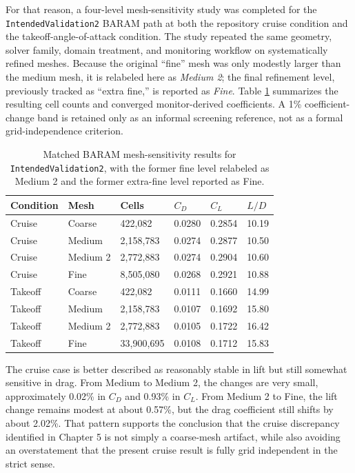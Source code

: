 \documentclass[12pt]{report}
\begin{document}
For that reason, a four-level mesh-sensitivity study was completed for the \texttt{IntendedValidation2} BARAM path at both the repository cruise condition and the takeoff-angle-of-attack condition. The study repeated the same geometry, solver family, domain treatment, and monitoring workflow on systematically refined meshes. Because the original ``fine'' mesh was only modestly larger than the medium mesh, it is relabeled here as \emph{Medium 2}; the final refinement level, previously tracked as ``extra fine,'' is reported as \emph{Fine}. Table \ref{tab:intendedvalidation2-grid-independence} summarizes the resulting cell counts and converged monitor-derived coefficients. A 1\% coefficient-change band is retained only as an informal screening reference, not as a formal grid-independence criterion.

\begin{table}[htbp]
\centering
\caption{Matched BARAM mesh-sensitivity results for \texttt{IntendedValidation2}, with the former fine level relabeled as Medium 2 and the former extra-fine level reported as Fine.}
\label{tab:intendedvalidation2-grid-independence}
\begin{tabular}{llllll}
\toprule
\textbf{Condition} & \textbf{Mesh} & \textbf{Cells} & \textbf{$C_D$} & \textbf{$C_L$} & \textbf{$L/D$} \\
\midrule
Cruise & Coarse & 422,082 & 0.0280 & 0.2854 & 10.19 \\
Cruise & Medium & 2,158,783 & 0.0274 & 0.2877 & 10.50 \\
Cruise & Medium 2 & 2,772,883 & 0.0274 & 0.2904 & 10.60 \\
Cruise & Fine & 8,505,080 & 0.0268 & 0.2921 & 10.88 \\
Takeoff & Coarse & 422,082 & 0.0111 & 0.1660 & 14.99 \\
Takeoff & Medium & 2,158,783 & 0.0107 & 0.1692 & 15.80 \\
Takeoff & Medium 2 & 2,772,883 & 0.0105 & 0.1722 & 16.42 \\
Takeoff & Fine & 33,900,695 & 0.0108 & 0.1712 & 15.83 \\
\bottomrule
\end{tabular}
\end{table}

The cruise case is better described as reasonably stable in lift but still somewhat sensitive in drag. From Medium to Medium 2, the changes are very small, approximately 0.02\% in \(C_D\) and 0.93\% in \(C_L\). From Medium 2 to Fine, the lift change remains modest at about 0.57\%, but the drag coefficient still shifts by about 2.02\%. That pattern supports the conclusion that the cruise discrepancy identified in Chapter 5 is not simply a coarse-mesh artifact, while also avoiding an overstatement that the present cruise result is fully grid independent in the strict sense.
\end{document}
